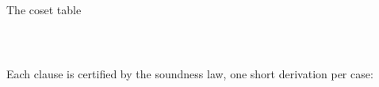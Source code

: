 \begin{frame}{The coset table  \InPaper}
\begin{columns}[c]
\begin{column}{0.60\textwidth}
\begin{code}
\AgdaSpace{}%
\AgdaSymbol{(}\AgdaSpace{}%
\AgdaSymbol{)}\AgdaSpace{}%
\AgdaSymbol{=}\AgdaSpace{}%
\AgdaOperator{\AgdaInductiveConstructor{[}}\AgdaSpace{}%
\AgdaSpace{}%
\AgdaOperator{\AgdaInductiveConstructor{]ʷ}}\AgdaSpace{}%
\AgdaOperator{\AgdaInductiveConstructor{,}}\AgdaSpace{}%
%
\>[36]\<%
\\
\>[0]\AgdaSpace{}%
\AgdaSymbol{(}\AgdaSpace{}%
\AgdaSymbol{)}\AgdaSpace{}%
\AgdaSymbol{(}\AgdaSpace{}%
\AgdaSymbol{)}\AgdaSpace{}%
\AgdaSymbol{=}\AgdaSpace{}%
\AgdaSpace{}%
\AgdaSymbol{(}\AgdaSpace{}%
\AgdaSpace{}%
\AgdaSymbol{)}\AgdaSpace{}%
\AgdaSpace{}%
\AgdaOperator{\AgdaInductiveConstructor{,}}\AgdaSpace{}%
\AgdaSpace{}%
\AgdaSymbol{(}\AgdaSpace{}%
\AgdaSymbol{(}\AgdaSpace{}%
\AgdaSpace{}%
\AgdaSymbol{))}\<%
\end{code}
Each clause is certified by the \alert{soundness law}, one short derivation per case:
\begin{code}%
\>[0]\AgdaSpace{}%
\AgdaSymbol{:}%
\>[405I]\AgdaSpace{}%
\AgdaSpace{}%
\AgdaSpace{}%
\AgdaSpace{}%
\AgdaSpace{}%
\AgdaSymbol{(}\AgdaSpace{}%
\AgdaOperator{\AgdaInductiveConstructor{,}}\AgdaSpace{}%
\AgdaSymbol{)}\AgdaSpace{}%
\AgdaSymbol{=}\AgdaSpace{}%
\AgdaSpace{}%
\AgdaSpace{}%
\AgdaSpace{}%
\<%
\\
\>[.][@{}l@{}]\<[405I]%
\>[13]\AgdaOperator{\AgdaFunction{[}}\AgdaSpace{}%
\AgdaSpace{}%
\AgdaOperator{\AgdaFunction{]ᶜ}}\AgdaSpace{}%
\AgdaSpace{}%
\AgdaOperator{\AgdaInductiveConstructor{[}}\AgdaSpace{}%
\AgdaSpace{}%
\AgdaOperator{\AgdaInductiveConstructor{]ʷ}}\AgdaSpace{}%
\AgdaSpace{}%
\AgdaSpace{}%
\AgdaSpace{}%
\AgdaSpace{}%
\AgdaOperator{\AgdaFunction{[}}\AgdaSpace{}%
\AgdaSpace{}%
\AgdaOperator{\AgdaFunction{]ᶜ}}\<%
\end{code}

\end{column}
\end{columns}
\end{frame}

